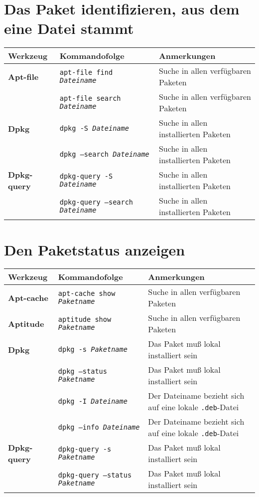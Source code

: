 \documentclass[10pt]{article}
\begin{document}
\section{Das Paket identifizieren, aus dem eine Datei stammt}
\begin{tabular}{ p{3.5cm} p{9cm} p{11cm}}
  \hline
  \rowcolor{Gray}
  \textbf{Werkzeug} & \textbf{Kommandofolge} & \textbf{Anmerkungen} \\
  \hline 
  \textbf{Apt-file} & \texttt{apt-file find \textit{Dateiname}} & Suche in allen verfügbaren Paketen\\
  \rowcolor{Gray}
  & \texttt{apt-file search \textit{Dateiname}} & Suche in allen verfügbaren Paketen\\
  \textbf{Dpkg} & \texttt{dpkg -S \textit{Dateiname}} & Suche in allen installierten Paketen\\
  \rowcolor{Gray}
  & \texttt{dpkg --search \textit{Dateiname}} & Suche in allen installierten Paketen \\
  \textbf{Dpkg-query} & \texttt{dpkg-query -S \textit{Dateiname}} & Suche in allen installierten Paketen\\
  \rowcolor{Gray}
  & \texttt{dpkg-query --search \textit{Dateiname}} & Suche in allen installierten Paketen \\
  \hline
\end{tabular}

\newpage
\cheatsheet

\section{Den Paketstatus anzeigen}
\begin{tabular}{ p{3.5cm} p{9cm} p{11cm}}
  \hline
  \rowcolor{Gray}
  \textbf{Werkzeug} & \textbf{Kommandofolge} & \textbf{Anmerkungen} \\
  \hline 
  \textbf{Apt-cache} & \texttt{apt-cache show \textit{Paketname}} & Suche in allen verfügbaren Paketen\\
  \rowcolor{Gray}
  \textbf{Aptitude} & \texttt{aptitude show \textit{Paketname}} & Suche in allen verfügbaren Paketen\\
  \textbf{Dpkg} & \texttt{dpkg -s \textit{Paketname}} & Das Paket muß lokal installiert sein \\
  \rowcolor{Gray}
  & \texttt{dpkg --status \textit{Paketname}} & Das Paket muß lokal installiert sein\\
  & \texttt{dpkg -I \textit{Dateiname}} & Der Dateiname bezieht sich auf eine lokale \texttt{.deb}-Datei \\
  \rowcolor{Gray}
  & \texttt{dpkg --info \textit{Dateiname}} & Der Dateiname bezieht sich auf eine lokale \texttt{.deb}-Datei\\
  \textbf{Dpkg-query} & \texttt{dpkg-query -s \textit{Paketname}} & Das Paket muß lokal installiert sein\\
  \rowcolor{Gray}
  & \texttt{dpkg-query --status \textit{Paketname}} & Das Paket muß lokal installiert sein \\
  \hline
\end{tabular}
\end{document}
